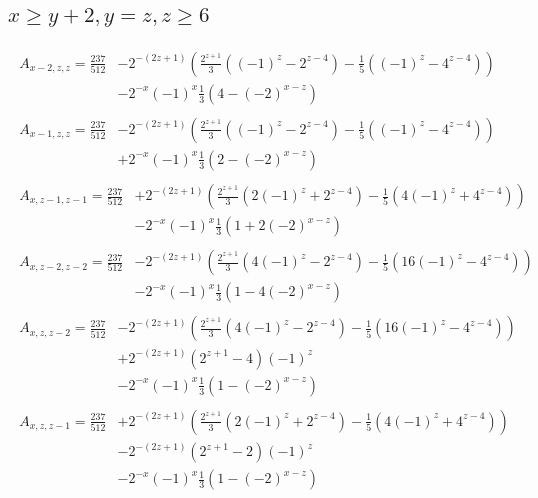 \subsection*{$x\ge y+2,y=z,z\ge6$}
\begin{align*}
\begin{split}
A_{x-2,z,z}=\frac{237}{512} &-2^{-(2z+1)}\left(\frac{2^{z+1}}{3}\left((-1)^z-2^{z-4}\right)-\frac{1}{5}\left((-1)^z-4^{z-4}\right)\right)\\
& -2^{-x}(-1)^x\frac{1}{3}\left(4-(-2)^{x-z}\right)
\end{split}\\
\begin{split}
A_{x-1,z,z}=\frac{237}{512} &-2^{-(2z+1)}\left(\frac{2^{z+1}}{3}\left((-1)^z-2^{z-4}\right)-\frac{1}{5}\left((-1)^z-4^{z-4}\right)\right)\\
& +2^{-x}(-1)^x\frac{1}{3}\left(2-(-2)^{x-z}\right)
\end{split}\\
\begin{split}
A_{x,z-1,z-1}=\frac{237}{512} &+2^{-(2z+1)}\left(\frac{2^{z+1}}{3}\left(2(-1)^z+2^{z-4}\right)-\frac{1}{5}\left(4(-1)^z+4^{z-4}\right)\right)\\
& -2^{-x}(-1)^x\frac{1}{3}\left(1+2(-2)^{x-z}\right)
\end{split}\\
\begin{split}
A_{x,z-2,z-2}=\frac{237}{512} &-2^{-(2z+1)}\left(\frac{2^{z+1}}{3}\left(4(-1)^z-2^{z-4}\right)-\frac{1}{5}\left(16(-1)^z-4^{z-4}\right)\right)\\
& -2^{-x}(-1)^x\frac{1}{3}\left(1-4(-2)^{x-z}\right)
\end{split}\\
\begin{split}
A_{x,z,z-2}=\frac{237}{512} &-2^{-(2z+1)}\left(\frac{2^{z+1}}{3}\left(4(-1)^z-2^{z-4}\right)-\frac{1}{5}\left(16(-1)^z-4^{z-4}\right)\right)\\
& +2^{-(2z+1)}\left(2^{z+1}-4\right)(-1)^z\\
& -2^{-x}(-1)^x\frac{1}{3}\left(1-(-2)^{x-z}\right)
\end{split}\\
\begin{split}
A_{x,z,z-1}=\frac{237}{512} &+2^{-(2z+1)}\left(\frac{2^{z+1}}{3}\left(2(-1)^z+2^{z-4}\right)-\frac{1}{5}\left(4(-1)^z+4^{z-4}\right)\right)\\
& -2^{-(2z+1)}\left(2^{z+1}-2\right)(-1)^z\\
& -2^{-x}(-1)^x\frac{1}{3}\left(1-(-2)^{x-z}\right)
\end{split}
\end{align*}

